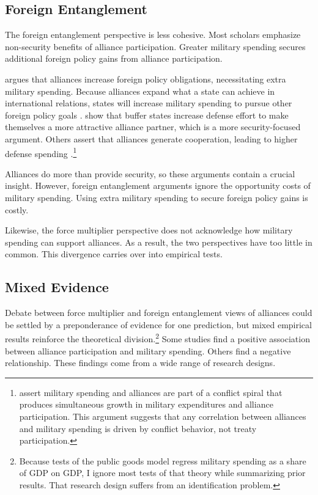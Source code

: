 \documentclass[12pt]{article}
\begin{document}
\subsection{Foreign Entanglement}


The foreign entanglement perspective is less cohesive.
Most scholars emphasize non-security benefits of alliance participation. 
Greater military spending secures additional foreign policy gains from alliance participation. 


\citet{Diehl1994} argues that alliances increase foreign policy obligations, necessitating extra military spending. 
Because alliances expand what a state can achieve in international relations, states will increase military spending to pursue other foreign policy goals \citep{MorganPalmer2006}. 
\citet{Horowitzetal2017} show that buffer states increase defense effort to make themselves a more attractive alliance partner, which is a more security-focused argument. 
Others assert that alliances generate cooperation, leading to higher defense spending \citep{Palmer1990, QuirozFlores2011}.\footnote{
\citet{SeneseVasquez2008} assert military spending and alliances are part of a conflict spiral that produces simultaneous growth in military expenditures and alliance participation. 
This argument suggests that any correlation between alliances and military spending is driven by conflict behavior, not treaty participation.
}


Alliances do more than provide security, so these arguments contain a crucial insight.
However, foreign entanglement arguments ignore the opportunity costs of military spending. 
Using extra military spending to secure foreign policy gains is costly.

 
Likewise, the force multiplier perspective does not acknowledge how military spending can support alliances. 
As a result, the two perspectives have too little in common. 
This divergence carries over into empirical tests. 


\subsection{Mixed Evidence} 


Debate between force multiplier and foreign entanglement views of alliances could be settled by a preponderance of evidence for one prediction, but mixed empirical results reinforce the theoretical division.\footnote{
Because tests of the public goods model regress military spending as a share of GDP on GDP, I ignore most tests of that theory while summarizing prior results. That research design suffers from an identification problem.}
Some studies find a positive association between alliance participation and military spending. 
Others find a negative relationship. 
These findings come from a wide range of research designs. 
\end{document}
